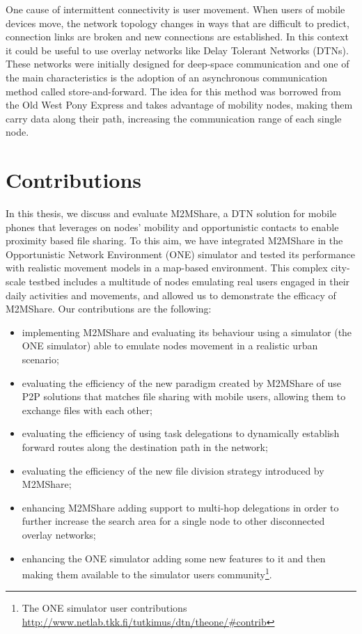 One cause of intermittent connectivity is user movement. When users of mobile devices move, the network topology changes in ways that are difficult to predict, connection links are broken and new connections are established. In this context it could be useful to use overlay networks like Delay Tolerant Networks (DTNs). These networks were initially designed for deep-space communication and one of the main characteristics is the adoption of an asynchronous communication method called store-and-forward. The idea for this method was borrowed from the Old West Pony Express and takes advantage of mobility nodes, making them carry data along their path, increasing the communication range of each single node.


\section{Contributions}
In this thesis, we discuss and evaluate M2MShare, a DTN solution for mobile phones that leverages on nodes' mobility and opportunistic contacts to enable proximity based file sharing. To this aim, we have integrated M2MShare in the Opportunistic Network Environment (ONE) simulator and tested its performance with realistic movement models in a map-based environment. This complex city-scale testbed includes a multitude of nodes emulating real users engaged in their daily activities and movements, and allowed us to demonstrate the efficacy of M2MShare. Our contributions are the following:
\begin{itemize}
\item implementing M2MShare and evaluating its behaviour using a simulator (the ONE simulator) able to emulate nodes movement in a realistic urban scenario;
\item evaluating the efficiency of the new paradigm created by M2MShare of use P2P solutions that matches file sharing with mobile users, allowing them to exchange files with each other;
\item evaluating the efficiency of using task delegations to dynamically establish forward routes along the destination path in the network;
\item evaluating the efficiency of the new file division strategy introduced by M2MShare;
\item enhancing M2MShare adding support to multi-hop delegations in order to further increase the search area for a single node to other disconnected overlay networks;
\item enhancing the ONE simulator adding some new features to it and then making them available to the simulator users community\footnote{The ONE simulator user contributions \href{http://www.netlab.tkk.fi/tutkimus/dtn/theone/\#contrib}{http://www.netlab.tkk.fi/tutkimus/dtn/theone/\#contrib}}.
\end{itemize}


